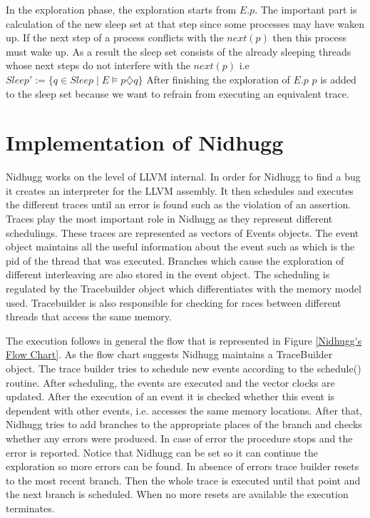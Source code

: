 In the exploration phase, the exploration starts from $E.p$. The important part is calculation of the new sleep set at that step since some processes may have waken up.
If the next step of a process conflicts with the $next(p)$ then this process must wake up. As a result the sleep set consists of the already sleeping threads whose next steps do not interfere with the $next(p)$ i.e
$Sleep' := \{q \in Sleep \mid E \models p \diamondsuit q \} $ 
After finishing the exploration of $E.p$ $p$ is added to the sleep set because we want to refrain from executing an equivalent trace.

\section{Implementation of Nidhugg}

Nidhugg works on the level of LLVM internal. In order for Nidhugg to find a bug it creates an interpreter for the LLVM assembly.
It then schedules and executes the different traces until an error is found such as the violation of an assertion.
Traces play the most important role in Nidhugg as they represent different schedulings. These traces are represented as vectors of Events objects.
The event object maintains all the useful information about the event such as which is the pid of the thread that was executed. Branches which cause the exploration
of different interleaving are also stored in the event object. The scheduling is regulated by the Tracebuilder object which differentiates with the memory model used.
Tracebuilder is also responsible for checking for races between different threads that access the same memory.

The execution follows in general the flow that is represented in Figure \ref{Nidhugg's Flow Chart}.
As the flow chart suggests Nidhugg maintains a TraceBuilder object. The trace builder tries to schedule new events according to the schedule() routine. After scheduling, the events
are executed and the vector clocks are updated. After the execution of an event it is checked whether this event is dependent with other events, i.e. accesses the same
memory locations. After that, Nidhugg tries to add branches to the appropriate places of the branch and checks whether any errors were produced. In case of error the procedure stops
and the error is reported. Notice that Nidhugg can be set so it can continue the exploration so more errors can be found. In absence of errors trace builder resets to the most recent branch.
Then the whole trace is executed until that point and the next branch is scheduled. When no more resets are available the execution terminates.

